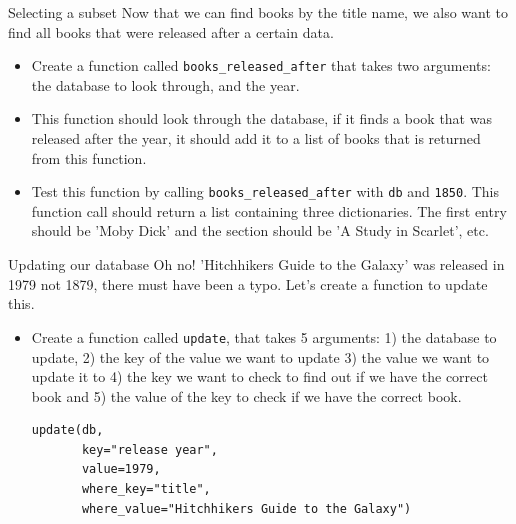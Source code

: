 \documentclass[10pt]{beamer}
\begin{document}
\begin{frame}[label={sec:orge92b3e9},fragile]{Selecting a subset}
 Now that we can find books by the title name, we also want to find all books that
were released after a certain data.

\begin{itemize}
\item Create a function called \texttt{books\_released\_after} that takes two arguments: the
database to look through, and the year.
\item This function should look through the database, if it finds a book that was
released after the year, it should add it to a list of books that is returned from
this function.
\item Test this function by calling \texttt{books\_released\_after} with \texttt{db} and \texttt{1850}. This function
call should return a list containing three dictionaries. The first entry should be
'Moby Dick' and the section should be 'A Study in Scarlet', etc.
\end{itemize}
\end{frame}

\begin{frame}[label={sec:org0680dcf},fragile]{Updating our database}
 Oh no! 'Hitchhikers Guide to the Galaxy' was released in 1979 not 1879, there must
have been a typo. Let's create a function to update this.

\begin{itemize}
\item Create a function called \texttt{update}, that takes 5 arguments: 1) the database to
update, 2) the key of the value we want to update 3) the value we want to update it
to 4) the key we want to check to find out if we have the correct book and 5) the
value of the key to check if we have the correct book.

\begin{verbatim}
update(db,
       key="release year",
       value=1979,
       where_key="title",
       where_value="Hitchhikers Guide to the Galaxy")
\end{verbatim}
\end{itemize}
\end{frame}
\end{document}
